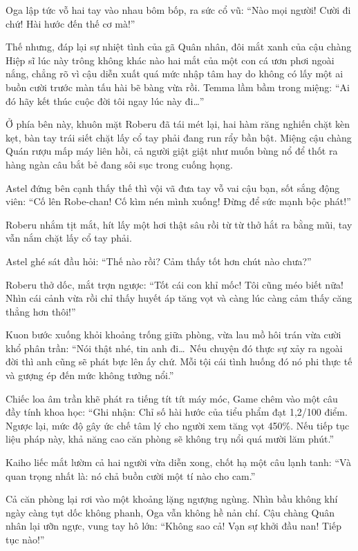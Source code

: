 \documentclass[../main.tex]{subfiles}
\begin{document}
Oga lập tức vỗ hai tay vào nhau bôm bốp, ra sức cổ vũ: ``Nào mọi người! Cười đi chứ! Hài hước đến thế cơ mà!''

Thế nhưng, đáp lại sự nhiệt tình của gã Quân nhân, đôi mắt xanh của cậu chàng Hiệp sĩ lúc này trông không khác nào hai mắt của một con cá ươn phơi ngoài nắng, chẳng rõ vì cậu diễn xuất quá mức nhập tâm hay do không có lấy một ai buồn cười trước màn tấu hài bẽ bàng vừa rồi. Temma lầm bầm trong miệng: ``Ai đó hãy kết thúc cuộc đời tôi ngay lúc này đi\dots''


Ở phía bên này, khuôn mặt Roberu đã tái mét lại, hai hàm răng nghiến chặt kèn kẹt, bàn tay trái siết chặt lấy cổ tay phải đang run rẩy bần bật. Miệng cậu chàng Quán rượu mấp máy liên hồi, cả người giật giật như muốn bùng nổ để thốt ra hàng ngàn câu bắt bẻ đang sôi sục trong cuống họng.

Astel đứng bên cạnh thấy thế thì vội vã đưa tay vỗ vai cậu bạn, sốt sắng động viên: ``Cố lên Robe-chan! Cố kìm nén mình xuống! Đừng để sức mạnh bộc phát!''


Roberu nhắm tịt mắt, hít lấy một hơi thật sâu rồi từ từ thở hắt ra bằng mũi, tay vẫn nắm chặt lấy cổ tay phải.

Astel ghé sát đầu hỏi: ``Thế nào rồi? Cảm thấy tốt hơn chút nào chưa?''

Roberu thở dốc, mắt trợn ngược: ``Tốt cái con khỉ mốc! Tôi cũng méo biết nữa! Nhìn cái cảnh vừa rồi chỉ thấy huyết áp tăng vọt và càng lúc càng cảm thấy căng thẳng hơn thôi!''

Kuon bước xuống khỏi khoảng trống giữa phòng, vừa lau mồ hôi trán vừa cười khổ phân trần: ``Nói thật nhé, tin anh đi\dots\ Nếu chuyện đó thực sự xảy ra ngoài đời thì anh cũng sẽ phát bực lên ấy chứ. Mỗi tội cái tình huống đó nó phi thực tế và gượng ép đến mức không tưởng nổi.''

Chiếc loa âm trần khẽ phát ra tiếng tít tít máy móc, Game chêm vào một câu đầy tính khoa học: ``Ghi nhận: Chỉ số hài hước của tiểu phẩm đạt 1,2/100 điểm. Ngược lại, mức độ gây ức chế tâm lý cho người xem tăng vọt 450\%. Nếu tiếp tục liệu pháp này, khả năng cao căn phòng sẽ không trụ nổi quá mười lăm phút.''

Kaiho liếc mắt lườm cả hai người vừa diễn xong, chốt hạ một câu lạnh tanh: ``Và quan trọng nhất là: nó chả buồn cười một tí nào cho cam.''

Cả căn phòng lại rơi vào một khoảng lặng ngượng ngùng. Nhìn bầu không khí ngày càng tụt dốc không phanh, Oga vẫn không hề nản chí. Cậu chàng Quân nhân lại ưỡn ngực, vung tay hô lớn:  ``Không sao cả! Vạn sự khởi đầu nan! Tiếp tục nào!''
\end{document}
